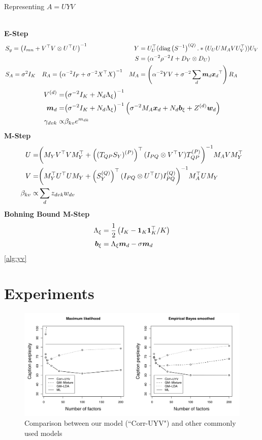 \begin{algorithm}
\caption{Representing $A=UYV$}
\label{alg:uyv}
$\text{ }$\\
{\bf E-Step}
    \begin{align*}
        & S_y = {\left( I_{mn} + V^\top V \otimes U^\top U \right)}^{-1} \quad &
Y & = U_U^\top (\text{diag} \left( {{S}^{-1}} \right)^{(Q)} .* (U_U U M_A V U_V^\top)) U_V \\
        & &
        S & = (\alpha^{-2}\rho^{-2} I + D_V \otimes D_U) \\
        & S_A = \sigma^2 I_K \quad R_A = {\left( \alpha^{-2} I_F + \sigma^{-2} X^\top X \right)}^{-1} 
        & M_A & = \left(\alpha^{-2} YV + \sigma^{-2} \sum_d \bm m_d { \bm x_d }^\top\right)R_A
    \end{align*}
    \begin{align*}
         V^{(d)} = & {\left( \sigma^{-2}I_K + N_d { \Lambda_{\xi} } \right)}^{-1}\\
         \bm m_d = & {\left( \sigma^{-2}I_K + N_d { \Lambda_{\xi} } \right)}^{-1} \left(\sigma^{-2} M_A { \bm x_d }  + N_d { \bm b_{\xi} } + Z^{(d)}\bm w_d \right )\\
        \gamma_{dvk} \propto & \beta_{kv} e^{m_{dk}} 
\end{align*}
{\bf M-Step}
\begin{align*}
    U = & {\left( M_Y V^\top V M_Y^\top + \left( { (T_{QP} S_Y)^{(P)} } \right)^\top (I_{PQ} \otimes V^\top V){ T_{QP}^{(P)} } \right)}^{-1} M_A V M_Y^\top \\
    V = & {\left( M_Y^\top U^\top U M_Y + \left({ S_Y^{(Q)} }\right)^\top (I_{PQ} \otimes U^\top U) { I_{PQ}^{(Q)} }  \right)}^{-1} M_A ^\top U M_Y \\
    \beta_{kv} \propto & \sum_d z_{dvk} w_{dv} 
\end{align*}
{\bf Bohning Bound M-Step}
    \begin{align*}
        { \Lambda_{\xi} } & = \frac{1}{2} \left(I_K - \mathbf{1}_K\mathbf{1}_K^\top / K  \right) \\
        { \bm b_{\xi} } & = { \Lambda_{\xi} } \bm m_d  - \sigma{ \bm m _d}
    \end{align*}
\ref{alg:yv}
\end{algorithm}



\section{Experiments}
\begin{figure}
  \centering
    \hspace*{-1.5cm}\includegraphics[height=0.25\textheight]{./Chap5/plots/figs/Fig5.png}
  \caption{Comparison between our model (``Corr-UYV") and other commonly used models}
  \label{fig:uyv-fig}
\end{figure}

